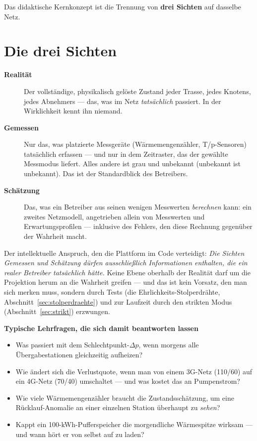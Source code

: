 \documentclass[11pt,a4paper,parskip=half]{scrreprt}
\newcommand{\ui}[1]{\textsf{\bfseries #1}}
\newenvironment{beispiel}[1][Beispiel]
  {\par\medskip{\color{bsp}\hrule height 0.8pt}\nopagebreak\smallskip
   \noindent\textbf{\textsf{\textcolor{bsp}{#1}}}\quad\ignorespaces}
  {\par\nopagebreak\smallskip{\color{bsp}\hrule height 0.8pt}\par\medskip}
\begin{document}
Das didaktische Kernkonzept ist die Trennung von \textbf{drei Sichten} auf
dasselbe Netz.

\section{Die drei Sichten}
\label{sec:dreisichten}

\begin{description}
  \item[\ui{Realität}] Der vollständige, physikalisch gelöste Zustand jeder
    Trasse, jedes Knotens, jedes Abnehmers --- das, was im Netz
    \emph{tatsächlich} passiert. In der Wirklichkeit kennt ihn niemand.
  \item[\ui{Gemessen}] Nur das, was platzierte Messgeräte
    (Wärmemengenzähler, T/p-Sensoren) tatsächlich erfassen --- und nur in dem
    Zeitraster, das der gewählte Messmodus liefert. Alles andere ist grau und
    unbekannt (\glqq unbekannt ist unbekannt\grqq). Das ist der Standardblick
    des Betreibers.
  \item[\ui{Schätzung}] Das, was ein Betreiber aus seinen wenigen Messwerten
    \emph{berechnen} kann: ein zweites Netzmodell, angetrieben allein von
    Messwerten und Erwartungsprofilen --- inklusive des Fehlers, den diese
    Rechnung gegenüber der Wahrheit macht.
\end{description}

Der intellektuelle Anspruch, den die Plattform im Code verteidigt: \emph{Die
Sichten Gemessen und Schätzung dürfen ausschließlich Informationen enthalten,
die ein realer Betreiber tatsächlich hätte.} Keine Ebene oberhalb der Realität
darf um die Projektion herum an die Wahrheit greifen --- und das ist kein
Vorsatz, den man sich merken muss, sondern durch Tests (die
\glqq Ehrlichkeits-Stolperdrähte\grqq, Abschnitt~\ref{sec:stolperdraehte}) und
zur Laufzeit durch den strikten Modus (Abschnitt~\ref{sec:strikt}) erzwungen.

\begin{beispiel}[Typische Lehrfragen, die sich damit beantworten lassen]
\begin{itemize}[nosep]
  \item Was passiert mit dem Schlechtpunkt-$\Delta p$, wenn morgens alle
    Übergabestationen gleichzeitig aufheizen?
  \item Wie ändert sich die Verlustquote, wenn man von einem 3G-Netz
    (110/60) auf ein 4G-Netz (70/40) umschaltet --- und was kostet das an
    Pumpenstrom?
  \item Wie viele Wärmemengenzähler braucht die Zustandsschätzung, um eine
    Rücklauf-Anomalie an einer einzelnen Station überhaupt zu \emph{sehen}?
  \item Kappt ein 100-kWh-Pufferspeicher die morgendliche Wärmespitze
    wirksam --- und wann hört er von selbst auf zu laden?
\end{itemize}
\end{beispiel}
\end{document}
